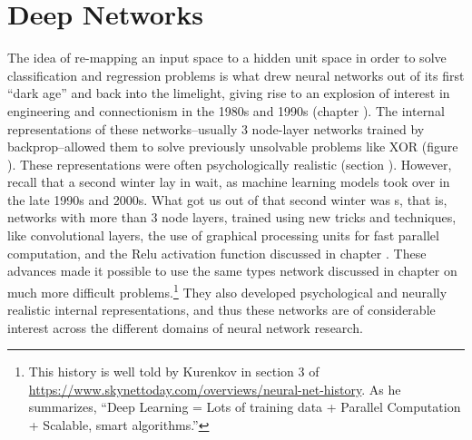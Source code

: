 \chapter{Deep Networks}\label{ch_deep_nets}


The idea of re-mapping an input space to a hidden unit space in order to solve classification and regression problems is what drew neural networks out of its first ``dark age'' and back into the limelight, giving rise to an explosion of interest in engineering and connectionism in the 1980s and 1990s (chapter ). The internal representations of these networks--usually 3 node-layer networks trained by backprop--allowed them to solve previously unsolvable problems like XOR (figure ). These representations were often psychologically realistic (section ). However, recall that a second  winter lay in wait, as machine learning models took over in the late 1990s and 2000s. What got us out of that second winter was s, that is, networks with more than 3 node layers, trained using new tricks and techniques, like convolutional layers, the use of graphical processing units for fast parallel computation, and the Relu activation function discussed in chapter . These advances made it possible to use the same types network discussed in chapter  on much more difficult problems.\footnote{This history is well told by Kurenkov in section 3 of \url{https://www.skynettoday.com/overviews/neural-net-history}. As he summarizes, ``Deep Learning = Lots of training data + Parallel Computation + Scalable, smart algorithms.''}  They also developed psychological and neurally realistic internal representations, and thus these networks are of considerable interest across the different domains of neural network research.

